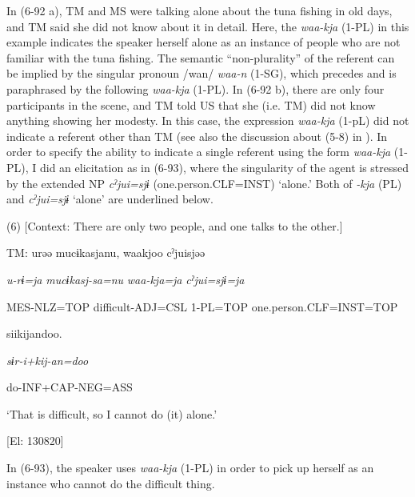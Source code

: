 In (6-92 a), TM and MS were talking alone about the tuna fishing in old days, and TM said she did not know about it in detail. Here, the \textit{waa-kja} (1-PL) in this example indicates the speaker herself alone as an instance of people who are not familiar with the tuna fishing. The semantic “non-plurality” of the referent can be implied by the singular pronoun /wan/ \textit{waa-n} (1-SG), which precedes and is paraphrased by the following \textit{waa-kja} (1-PL). In (6-92 b), there are only four participants in the scene, and TM told US that she (i.e. TM) did not know anything showing her modesty. In this case, the expression \textit{waa-kja} (1-pL) did not indicate a referent other than TM (see also the discussion about (5-8) in ). In order to specify the ability to indicate a single referent using the form \textit{waa-kja} (1-PL), I did an elicitation as in (6-93), where the singularity of the agent is stressed by the extended NP \textit{cˀjui=sjɨ} (one.person.CLF=INST) ‘alone.’ Both of \textit{{}-kja} (PL) and \textit{cˀjui=sjɨ} ‘alone’ are underlined below.

(6)  [Context: There are only two people, and one talks to the other.]

  TM:  urəə  mucɨkasjanu,  waakjoo  cˀjuisjəə

    \textit{u-rɨ=ja}  \textit{mucɨkasj-sa=nu}  \textit{waa-kja=ja}  \textit{cˀjui=sjɨ=ja}

    MES-NLZ=TOP  difficult-ADJ=CSL  1-PL=TOP  one.person.CLF=INST=TOP

    siikijandoo.

    \textit{sɨr-i+kij-an=doo}

    do-INF+CAP-NEG=ASS

    ‘That is difficult, so I cannot do (it) alone.’

    [El: 130820]

In (6-93), the speaker uses \textit{waa-kja} (1-PL) in order to pick up herself as an instance who cannot do the difficult thing.

